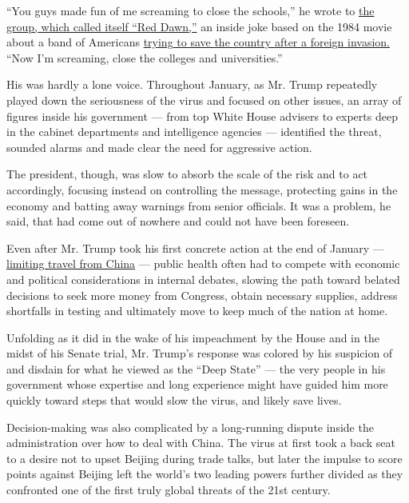 ``You guys made fun of me screaming to close the schools,'' he wrote to
\href{https://int.graylady3jvrrxbe.onion/data/documenthelper/6879-2020-covid-19-red-dawn-rising/66f590d5cd41e11bea0f/optimized/full.pdf\#page=1}{the
group, which called itself ``Red Dawn,''} an inside joke based on the
1984 movie about a band of Americans
\href{https://www.youtube.com/watch?v=mRTzUHmx9ZA}{trying to save the
country after a foreign invasion.} ``Now I'm screaming, close the
colleges and universities.''

His was hardly a lone voice. Throughout January, as Mr. Trump repeatedly
played down the seriousness of the virus and focused on other issues, an
array of figures inside his government --- from top White House advisers
to experts deep in the cabinet departments and intelligence agencies ---
identified the threat, sounded alarms and made clear the need for
aggressive action.

The president, though, was slow to absorb the scale of the risk and to
act accordingly, focusing instead on controlling the message, protecting
gains in the economy and batting away warnings from senior officials. It
was a problem, he said, that had come out of nowhere and could not have
been foreseen.

Even after Mr. Trump took his first concrete action at the end of
January ---
\href{https://www.nytimes3xbfgragh.onion/2020/01/31/business/china-travel-coronavirus.html}{limiting
travel from China} --- public health often had to compete with economic
and political considerations in internal debates, slowing the path
toward belated decisions to seek more money from Congress, obtain
necessary supplies, address shortfalls in testing and ultimately move to
keep much of the nation at home.

Unfolding as it did in the wake of his impeachment by the House and in
the midst of his Senate trial, Mr. Trump's response was colored by his
suspicion of and disdain for what he viewed as the ``Deep State'' ---
the very people in his government whose expertise and long experience
might have guided him more quickly toward steps that would slow the
virus, and likely save lives.

Decision-making was also complicated by a long-running dispute inside
the administration over how to deal with China. The virus at first took
a back seat to a desire not to upset Beijing during trade talks, but
later the impulse to score points against Beijing left the world's two
leading powers further divided as they confronted one of the first truly
global threats of the 21st century.

